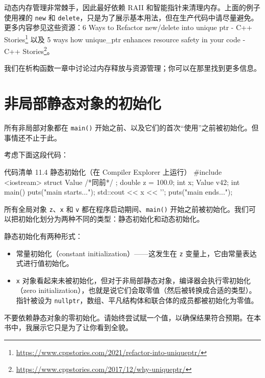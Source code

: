 \begin{myWarnBox}
动态内存管理非常棘手，因此最好依赖 RAII 和智能指针来清理内存。上面的例子使用裸的 \texttt{new} 和 \texttt{delete}，只是为了展示基本用法，但在生产代码中请尽量避免。更多内容参见这些资源：6 Ways to Refactor new/delete into unique ptr - C++ Stories\footnote{\url{https://www.cppstories.com/2021/refactor-into-uniqueptr/}} 以及 5 ways how unique\_ptr enhances resource safety in your code - C++ Stories\footnote{\url{https://www.cppstories.com/2017/12/why-uniqueptr/}}。
\end{myWarnBox}

我们在析构函数一章中讨论过内存释放与资源管理；你可以在那里找到更多信息。

\section{非局部静态对象的初始化}

所有非局部对象都在 \texttt{main()} 开始之前、以及它们的首次“使用”之前被初始化。但事情还不止于此。

考虑下面这段代码：

\begin{codeboxt}[cpp]{代码清单 11.4 静态初始化（在 Compiler Explorer 上运行）}
#include <iostream>
struct Value { /*同前*/ };
double z = 100.0;
int x;
Value v{42};
int main() {
puts("main starts...");
std::cout << x << '\n';
puts("main ends...");
}
\end{codeboxt}

所有全局对象 \texttt{z}、\texttt{x} 和 \texttt{v} 都在程序启动期间、\texttt{main()} 开始之前被初始化。我们可以把初始化划分为两种不同的类型：静态初始化和动态初始化。

静态初始化有两种形式：


\begin{itemize}
\item 常量初始化（constant initialization）——这发生在 \texttt{z} 变量上，它由常量表达式进行值初始化。
\item \texttt{x} 对象看起来未被初始化，但对于非局部静态对象，编译器会执行零初始化（zero initialization），也就是说它们会取零值（然后被转换成合适的类型）。指针被设为 \texttt{nullptr}，数组、平凡结构体和联合体的成员都被初始化为零值。
\end{itemize}

\begin{myWarnBox}
不要依赖静态对象的零初始化。请始终尝试赋一个值，以确保结果符合预期。在本书中，我展示它只是为了让你看到全貌。
\end{myWarnBox}

